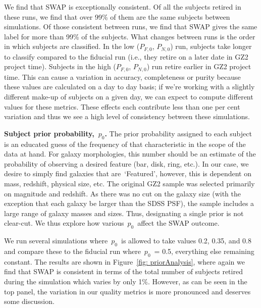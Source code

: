 \documentclass[twocolumn]{aastex6}
\newcommand{\Pf}{$P_{F,0}$}
\newcommand{\Pn}{$P_{N,0}$}
\newcommand{\p}{$p_0$}
\newcommand{\feat}{`Featured'}
\begin{document}
We find that SWAP is exceptionally consistent. Of all the subjects retired in
these runs, we find that over 99\% of them are the same subjects between simulations.
Of those consistent between runs, we find that SWAP gives the same label for 
more than 99\% of the subjects. What changes between runs is the order in 
which subjects are classified. In the low (\Pf, \Pn) run, subjects take longer to classify 
compared to the fiducial run (i.e., they retire on a later date in GZ2 project time). 
Subjects in the high (\Pf, \Pn) run retire earlier in GZ2 project time. This can cause
a variation in accuracy, completeness or purity because these values are 
calculated on a day to day basis; if we're working with a slightly different make-up
of subjects on a given day, we can expect to compute different values for these metrics.
These effects each contribute less than one per cent variation and thus we see a 
high level of consistency between these simulations. 



\begin{figure}[t!]

\end{figure}


\textbf{Subject prior probability,~\p.}
The prior probability assigned to each subject is an educated guess of 
the frequency of that characteristic in the scope of the data at hand. 
For galaxy morphologies, this number should be an estimate of the probability
of observing a desired feature (bar, disk, ring, etc.). In our case, 
we desire to simply find galaxies that are~\feat, however, this is dependent 
on mass, redshift, physical size, etc. The original GZ2 sample was selected
primarily on magnitude and redshift.  As there was no cut on the galaxy size
(with the exception that each galaxy be larger than the SDSS PSF), the sample
includes a large range of galaxy masses and sizes. Thus, designating a single 
prior is not clear-cut. We thus explore how various~\p~affect the SWAP outcome.

We run several simulations where~\p~is allowed to take values 0.2, 0.35, and 0.8 
and compare these to the fiducial run where~\p~= 0.5, everything else remaining constant.
The results are shown in Figure~\ref{fig: priorAnalysis}, where again we find that 
SWAP is consistent in terms of the total number of subjects retired 
during the simulation which varies by only 1\%. 
However, as can be seen in the top panel, the variation in our quality metrics is 
more pronounced and deserves some discussion. 
\end{document}
